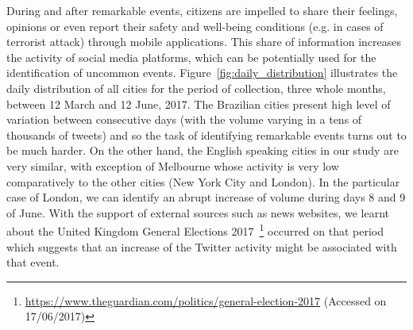 During and after remarkable events, citizens are impelled to share their feelings, opinions or even report their safety and well-being conditions (e.g. in cases of terrorist attack) through mobile applications. This share of information increases the activity of social media platforms, which can be potentially used for the identification of uncommon events. Figure~\ref{fig:daily_distribution} illustrates the daily distribution of all cities for the period of collection, three whole months, between 12 March and 12 June, 2017. The Brazilian cities present high level of variation between consecutive days (with the volume varying in a tens of thousands of tweets) and so the task of identifying remarkable events turns out to be much harder. On the other hand, the English speaking cities in our study are very similar, with exception of Melbourne whose activity is very low comparatively to the other cities (New York City and London). In the particular case of London, we can identify an abrupt increase of volume during days 8 and 9 of June. With the support of external sources such as news websites, we learnt about the United Kingdom General Elections 2017~\footnote{\url{https://www.theguardian.com/politics/general-election-2017} (Accessed on 17/06/2017)} occurred on that period which suggests that an increase of the Twitter activity might be associated with that event. 

